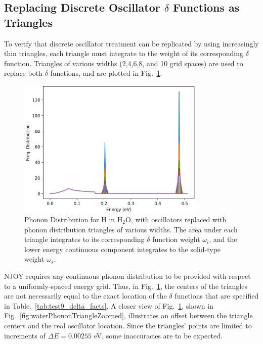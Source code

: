 \documentclass[Master.tex]{subfiles}
\begin{document}
  \subsection{Replacing Discrete Oscillator $\delta$ Functions as Triangles}
    To verify that discrete oscillator treatment can be replicated by using increasingly thin triangles, each triangle must integrate to the weight of its corresponding $\delta$ function. Triangles of various widths (2,4,6,8, and 10 grid spaces) are used to replace both $\delta$ functions, and are plotted in Fig.~\ref{fig:waterPhononTriangle}.
    \begin{figure}[h]
      \begin{center}
        \includegraphics[width=0.8\textwidth]{waterPhononDistTrianglesb}
        \caption[Triangles of various widths approximatin $\delta$ functions for H in H$_2$O]{Phonon Distribution for H in H$_2$O, with oscillators replaced with phonon distribution triangles of various widths. The area under each triangle integrates to its corresponding $\delta$ function weight $\omega_i$, and the lower energy continuous component integrates to the solid-type weight $\omega_s$.}
        \label{fig:waterPhononTriangle}
      \end{center}
    \end{figure}

    NJOY requires any continuous phonon distribution to be provided with respect to a uniformly-spaced energy grid. Thus, in Fig.~\ref{fig:waterPhononTriangle}, the centers of the triangles are not necessarily equal to the exact location of the $\delta$ functions that are specified in Table.~\ref{tab:test9_delta_facts}. A closer view of Fig.~\ref{fig:waterPhononTriangle}, shown in Fig.~\ref{fig:waterPhononTriangleZoomed}, illustrates an offset between the triangle centers and the real oscillator location. Since the triangles' points are limited to increments of $\Delta E=0.00255$ eV, some inaccuracies are to be expected.
\end{document}
